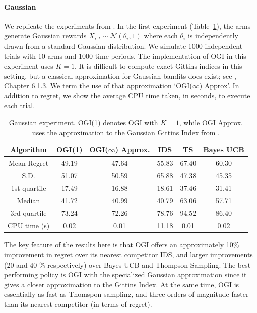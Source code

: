 \paragraph{Gaussian}We replicate the experiments from \cite{russo2014learning}. In the first experiment (Table~\ref{table:gaussian_experiment1}), the arms generate Gaussian rewards  $X_{i,t} \sim \mathcal{N}(\theta_i, 1)$ where each $\theta_i$ is independently drawn from a standard Gaussian distribution. We simulate 1000 independent trials with 10 arms and 1000 time periods. The implementation of OGI in this experiment uses $K = 1$. It is difficult to compute exact Gittins indices in this setting, but a classical approximation for Gaussian bandits does exist; see \cite{powell2012optimal}, Chapter 6.1.3. We term the use of that approximation `OGI($\infty$) Approx'.  In addition to regret, we  show the average CPU time taken, in seconds, to execute each trial.

\begin{table}[h!]
	\centering
	\begin{tabular}{| c | c | c | c | c | c |} \hline
		\textbf{Algorithm}  & \textbf{OGI(1)} & \textbf{OGI($\infty$) Approx.} & \textbf{IDS} & \textbf{TS} & \textbf{Bayes UCB}\\ \hline
		Mean Regret   & 49.19 & 47.64  &  55.83 & 67.40 & 60.30  \\ \hline
		S.D.  & 51.07 & 50.59 & 65.88 & 47.38 & 45.35 \\ \hline
		1st quartile  & 17.49 & 16.88  & 18.61 & 37.46 & 31.41 \\ \hline
		Median  & 41.72 & 40.99 & 40.79 & 63.06 & 57.71 \\ \hline
		3rd quartile  & 73.24 & 72.26 & 78.76 & 94.52 & 86.40 \\ \hline
		CPU time (s) & 0.02 & 0.01 & 11.18 & 0.01 & 0.02 \\ \hline
	\end{tabular}
	\caption[Table caption text]{Gaussian experiment. OGI(1) denotes OGI with $K =1$, while OGI Approx. uses the approximation to the Gaussian Gittins Index from \cite{powell2012optimal}.}
	\label{table:gaussian_experiment1}
\end{table}

The key feature of the results here is that OGI offers an approximately 10\% improvement in regret over its nearest competitor IDS, and larger improvements (20 and 40 \% respectively) over Bayes UCB and Thompson Sampling. The best performing policy is OGI with the specialized Gaussian approximation since it gives a closer approximation to the Gittins Index. At the same time, OGI is essentially as fast as Thomspon sampling, and three orders of magnitude faster than its nearest competitor (in terms of regret). 


